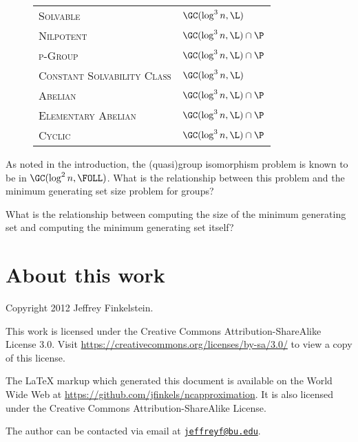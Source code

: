\documentclass{article}
\newcommand{\email}[1]{\href{mailto:#1}{\nolinkurl{#1}}}
\begin{document}
\begin{figure}
\begin{center}
\begin{tabular}{l | l}
      \textsc{Solvable} & $\GC(\log^3 n, \L)$ \\
      \textsc{Nilpotent} & $\GC(\log^3 n, \L) \cap \P$ \\
      \textsc{p-Group} & $\GC(\log^3 n, \L) \cap \P$ \\
      \textsc{Constant Solvability Class} & $\GC(\log^3 n, \L)$ \\
      \textsc{Abelian} & $\GC(\log^3 n, \L) \cap \P$ \\
      \textsc{Elementary Abelian} & $\GC(\log^3 n, \L) \cap \P$ \\
      \textsc{Cyclic} & $\GC(\log^3 n, \L) \cap \P$
    \end{tabular}
  \end{center}
\end{figure}

As noted in the introduction, the (quasi)group isomorphism problem is known to be in $\GC(\log^2 n, \FOLL)$.
What is the relationship between this problem and the minimum generating set size problem for groups?

What is the relationship between computing the size of the minimum generating set and computing the minimum generating set itself?

\section{About this work}

Copyright 2012 Jef{}frey Finkelstein.

This work is licensed under the Creative Commons Attribution-ShareAlike License 3.0.
Visit \mbox{\url{https://creativecommons.org/licenses/by-sa/3.0/}} to view a copy of this license.

The \LaTeX{} markup which generated this document is available on the World Wide Web at \mbox{\url{https://github.com/jfinkels/ncapproximation}}.
It is also licensed under the Creative Commons Attribution-ShareAlike License.

The author can be contacted via email at \email{jeffreyf@bu.edu}.



\end{document}
